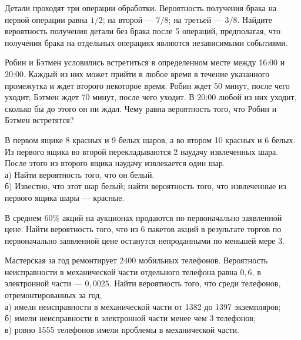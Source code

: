 \newpage\setcounter{zad}{0}



\begin{zkrW}{20}\noindent 
	Детали проходят три операции обработки. Вероятность получения брака на первой операции равна $1/2$; на второй --- $7/8$; на третьей --- $3/8$. Найдите вероятность получения детали без брака после 5 операций, предполагая, что получения брака на отдельных операциях являются независимыми событиями.
 
\end{zkrW}

\begin{zkrW}{20}\noindent 
	Робин и Бэтмен условились встретиться в определенном месте между 16:00 и 20:00. Каждый из них может прийти в любое время в течение указанного промежутка и ждет второго некоторое время. Робин ждет 50 минут, после чего уходит; Бэтмен ждет 70 минут, после чего уходит. В 20:00 любой из них уходит, сколько бы до этого он ни ждал. Чему равна вероятность того, что Робин и Бэтмен встретятся?
 
\end{zkrW}

\begin{zkrW}{20}\noindent 
	В первом ящике 8 красных и 9 белых шаров, а во втором 10 красных и 6 белых. Из первого ящика во второй перекладываются 2 наудачу извлеченных шара. После этого из второго ящика наудачу извлекается один шар. \\ \indent а) Найти вероятность того, что он белый. \\ \indent б) Известно, что этот шар белый; найти вероятность того, что извлеченные из первого ящика шары --- красные.
 
\end{zkrW}

\begin{zkrW}{20}\noindent 
	В среднем $60\%$ акций на аукционах продаются по первоначально заявленной цене. Найти вероятность того, что из 6 пакетов акций в результате торгов по первоначально заявленной цене останутся непроданными по меньшей мере 3.
 
\end{zkrW}

\begin{zkrW}{20}\noindent 
	Мастерская за год ремонтирует 2400 мобильных телефонов. Вероятность неисправности в механической части отдельного телефона равна $0{,}6$, в электронной части --- $0{,}0025$. Найти вероятность того, что среди телефонов, отремонтированных за год, \\ \indent а) имели неисправности в механической части от 1382 до 1397 экземпляров; \\ \indent б) имели неисправности в электронной части менее чем 3 телефонов; \\ \indent в) ровно 1555 телефонов имели проблемы в механической части.
 
\end{zkrW}

